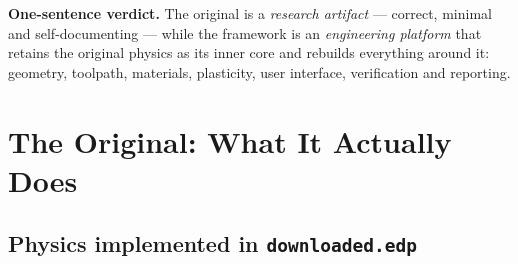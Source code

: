 \documentclass[10pt,a4paper]{article}
\newcommand{\file}[1]{\texttt{\small #1}}
\begin{document}
\noindent\textbf{One-sentence verdict.} The original is a \emph{research
artifact} --- correct, minimal and self-documenting --- while the framework is
an \emph{engineering platform} that retains the original physics as its inner
core and rebuilds everything around it: geometry, toolpath, materials,
plasticity, user interface, verification and reporting.

\section{The Original: What It Actually Does}

\subsection{Physics implemented in \file{downloaded.edp}}
\end{document}
